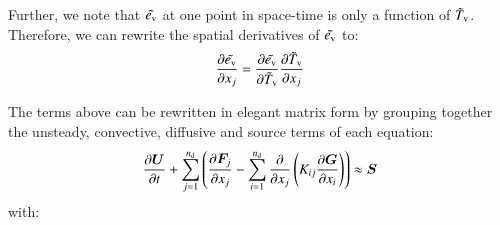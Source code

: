 \documentclass{warpdoc}
\newcommand{\nd}{{{n}_{\rm d}}}
\newcommand{\ev}{e_{\rm v}}
\begin{document}
Further, we note that ${\wtilde{\ev}}$ at one point in space-time is only a function of ${\tilde{T}_{\rm v}}$. Therefore, we can rewrite the spatial derivatives of ${\wtilde{\ev}}$  to:
%
\begin{equation}
  \frac{\partial {\wtilde{\ev}}}{\partial x_j} = \frac{\partial {\wtilde{\ev}}}{\partial {\wtilde{T}_{\rm v}}}\frac{\partial {\wtilde{T}_{\rm v}}}{\partial x_j}
\end{equation}
%

The terms above can be rewritten in elegant matrix form by
grouping together the unsteady, convective, diffusive and source
terms of each equation:
%
\begin{equation}
\frac{\partial \bm{U}}{\partial t} + \sum_{j=1}^\nd \left( \frac{\partial \bm{F}_j}{\partial x_j}
 - \sum_{i=1}^\nd \frac{\partial }{\partial x_j}
     \left( K_{ij} \frac{\partial \bm{G}}{\partial x_i} \right)\right)
  \approx \bm{S}
 \label{eqn:favre}
\end{equation}
%
with:
%
\end{document}
